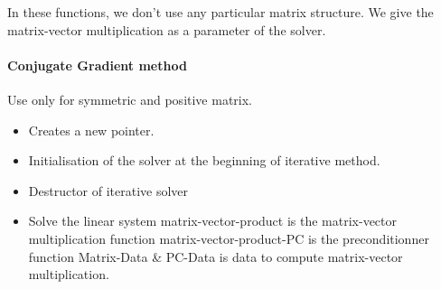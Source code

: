 In these functions, we don't use any particular matrix structure. We give the
matrix-vector multiplication as a parameter of the solver. 

\paragraph{Conjugate Gradient method}

Use only for symmetric and positive matrix.
\begin{itemize}
\item 
  \sshortdescribe Creates a new  pointer.  
\item {}
  \sshortdescribe Initialisation of the solver at the beginning of iterative method.  
\item {}
  \sshortdescribe Destructor of iterative solver  
\item {}
  \sshortdescribe Solve the linear system matrix-vector-product is the matrix-vector multiplication function matrix-vector-product-PC is the preconditionner function Matrix-Data \& PC-Data is data to compute matrix-vector multiplication.  
\end{itemize}
